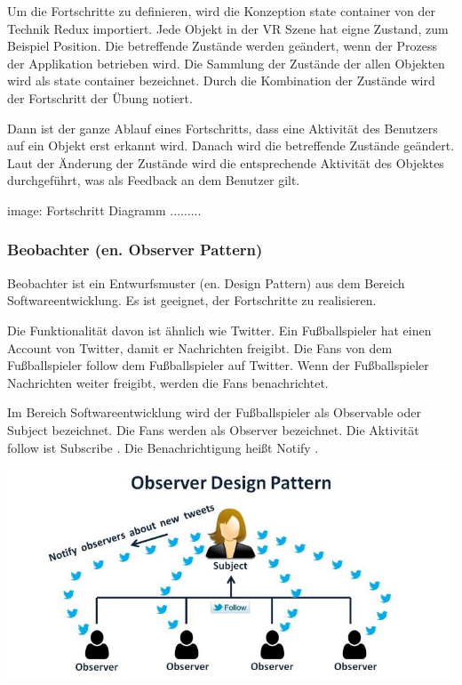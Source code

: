  Um die Fortschritte zu definieren, wird die Konzeption \glqq state container \grqq von der Technik Redux importiert. Jede Objekt in der VR Szene hat eigne Zustand, zum Beispiel Position. Die betreffende Zustände werden geändert, wenn der Prozess der Applikation betrieben wird. Die Sammlung der Zustände der allen Objekten wird als \glqq state container \grqq bezeichnet. Durch die Kombination der Zustände wird der Fortschritt der Übung notiert.
 
 Dann ist der ganze Ablauf eines Fortschritts, dass eine Aktivität des Benutzers auf ein Objekt erst erkannt wird. Danach wird die betreffende Zustände geändert. Laut der Änderung der Zustände wird die entsprechende Aktivität des Objektes durchgeführt, was als Feedback an dem Benutzer gilt.
 
 image: Fortschritt Diagramm .........
 
  \subsubsection{Beobachter (en. Observer Pattern)}
  Beobachter ist ein Entwurfsmuster (en. Design Pattern) aus dem Bereich Softwareentwicklung. Es ist geeignet, der Fortschritte zu realisieren.
  
  Die Funktionalität davon ist ähnlich wie Twitter. Ein Fußballspieler hat einen Account von Twitter, damit er Nachrichten freigibt. Die Fans von dem Fußballspieler \glqq follow \grqq dem Fußballspieler auf Twitter. Wenn der Fußballspieler Nachrichten weiter freigibt, werden die Fans benachrichtet.
  
  Im Bereich Softwareentwicklung wird der Fußballspieler als \glqq Observable \grqq oder \glqq Subject \grqq bezeichnet. Die Fans werden als \glqq Observer \grqq bezeichnet. Die Aktivität \glqq follow \grqq ist \glqq Subscribe \grqq. Die Benachrichtigung heißt \glqq Notify \grqq.
  
  \includegraphics[width=\textwidth]{images/observerPattern.jpeg}
  
